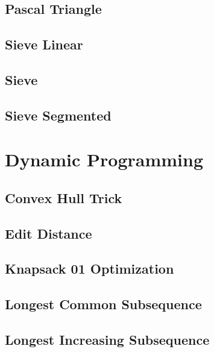 \subsection{Pascal Triangle}
\raggedbottom
\hrulefill
\subsection{Sieve Linear}
\raggedbottom
\hrulefill
\subsection{Sieve}
\raggedbottom
\hrulefill
\subsection{Sieve Segmented}
\raggedbottom
\hrulefill

\section{Dynamic Programming}
\subsection{Convex Hull Trick}
\raggedbottom
\hrulefill
\subsection{Edit Distance}
\raggedbottom
\hrulefill
\subsection{Knapsack 01 Optimization}
\raggedbottom
\hrulefill
\subsection{Longest Common Subsequence}
\raggedbottom
\hrulefill
\subsection{Longest Increasing Subsequence}
\raggedbottom
\hrulefill
